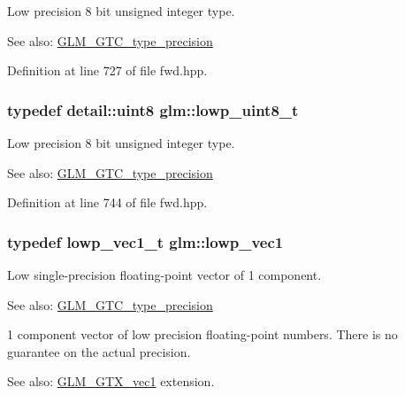 Low precision 8 bit unsigned integer type. \begin{Desc}
\item[See also:]\hyperlink{group__gtc__type__precision}{GLM\_\-GTC\_\-type\_\-precision} \end{Desc}


Definition at line 727 of file fwd.hpp.\hypertarget{group__gtc__type__precision_g0910ef24195d1b8b26e34d73148c0c45}{
\subsubsection[lowp\_\-uint8\_\-t]{\setlength{\rightskip}{0pt plus 5cm}typedef detail::uint8 {\bf glm::lowp\_\-uint8\_\-t}}}
\label{group__gtc__type__precision_g0910ef24195d1b8b26e34d73148c0c45}


Low precision 8 bit unsigned integer type. \begin{Desc}
\item[See also:]\hyperlink{group__gtc__type__precision}{GLM\_\-GTC\_\-type\_\-precision} \end{Desc}


Definition at line 744 of file fwd.hpp.\hypertarget{group__gtc__type__precision_ge48c64f920be353ece773ff367f0161c}{
\subsubsection[lowp\_\-vec1]{\setlength{\rightskip}{0pt plus 5cm}typedef lowp\_\-vec1\_\-t {\bf glm::lowp\_\-vec1}}}
\label{group__gtc__type__precision_ge48c64f920be353ece773ff367f0161c}


Low single-precision floating-point vector of 1 component. \begin{Desc}
\item[See also:]\hyperlink{group__gtc__type__precision}{GLM\_\-GTC\_\-type\_\-precision}\end{Desc}
1 component vector of low precision floating-point numbers. There is no guarantee on the actual precision. \begin{Desc}
\item[See also:]\hyperlink{group__gtx__vec1}{GLM\_\-GTX\_\-vec1} extension. \end{Desc}



